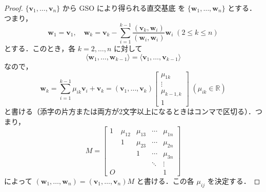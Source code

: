 \documentclass[11pt, uplatex, dvipdfmx]{jsarticle}
\theoremstyle{definition}
\begin{document}
\begin{proof}
  $\{\bm{v}_1, \ldots, \bm{v}_n\}$ から GSO により得られる直交基底
  を $\{\bm{w}_1, \ldots, \bm{w}_n\}$ とする．つまり，
  \[
    \bm{w}_1 = \bm{v}_1, \quad \bm{w}_k = \bm{v}_k - \sum_{i=1}^{k-1}
    \frac{(\bm{v}_k, \bm{w}_{i})}{(\bm{w}_i,\bm{w}_i)}\bm{w}_i \; (2 \leq k \leq n)
  \]
  とする．このとき，各 $k=2,\ldots, n$ に対して
  \[
    \langle \bm{w}_1, \ldots, \bm{w}_{k-1}\rangle =\langle \bm{v}_1,
    \ldots, \bm{v}_{k-1}\rangle
  \]
  なので，
  \[
    \bm{w}_k = \sum_{i=1}^{k-1}\mu_{i k} \bm{v}_i + \bm{v}_k = \left(\bm{v}_1, \ldots, \bm{v}_{k}\right) \left[
      \begin{array}{c}
        \mu_{1k}\\
        \vdots\\
        \mu_{k-1,k}\\
        1
      \end{array}
    \right]\; (\mu_{ik} \in \mathbb{R})
  \]
  と書ける（添字の片方または両方が2文字以上になるときはコンマで区切る）．つ
  まり，
  \[
    M = \left[
      \begin{array}{ccccc}
        1 & \mu_{12} & \mu_{13} & \cdots & \mu_{1n}\\
          & 1 & \mu_{23} & \cdots & \mu_{2n}\\
          &  & 1 & \cdots & \mu_{3n}\\
          &  &  & \ddots & \vdots\\
        O &  &  &  & 1
      \end{array}
    \right]
  \]
  によって $(\bm{w}_1, \ldots, \bm{w}_n) = (\bm{v}_1, \ldots,
  \bm{v}_n) M$ と書ける．この各 $\mu_{ij}$ を決定する．
  

\end{proof}
\end{document}
